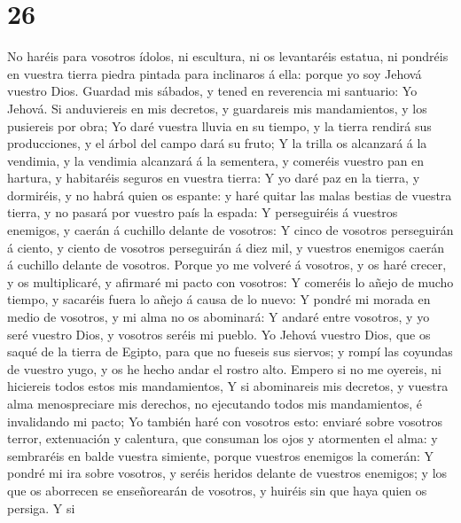 \hypertarget{section-25}{%
\section{26}\label{section-25}}

 No haréis para vosotros ídolos, ni escultura, ni os
levantaréis estatua, ni pondréis en vuestra tierra piedra pintada para
inclinaros á ella: porque yo soy Jehová vuestro Dios. 
Guardad mis sábados, y tened en reverencia mi santuario: Yo Jehová.
 Si anduviereis en mis decretos, y guardareis mis
mandamientos, y los pusiereis por obra;  Yo daré vuestra
lluvia en su tiempo, y la tierra rendirá sus producciones, y el árbol
del campo dará su fruto;  Y la trilla os alcanzará á la
vendimia, y la vendimia alcanzará á la sementera, y comeréis vuestro pan
en hartura, y habitaréis seguros en vuestra tierra:  Y yo
daré paz en la tierra, y dormiréis, y no habrá quien os espante: y haré
quitar las malas bestias de vuestra tierra, y no pasará por vuestro país
la espada:  Y perseguiréis á vuestros enemigos, y caerán á
cuchillo delante de vosotros:  Y cinco de vosotros
perseguirán á ciento, y ciento de vosotros perseguirán á diez mil, y
vuestros enemigos caerán á cuchillo delante de vosotros. 
Porque yo me volveré á vosotros, y os haré crecer, y os multiplicaré, y
afirmaré mi pacto con vosotros:  Y comeréis lo añejo de
mucho tiempo, y sacaréis fuera lo añejo á causa de lo nuevo:
 Y pondré mi morada en medio de vosotros, y mi alma no os
abominará:  Y andaré entre vosotros, y yo seré vuestro
Dios, y vosotros seréis mi pueblo.  Yo Jehová vuestro
Dios, que os saqué de la tierra de Egipto, para que no fueseis sus
siervos; y rompí las coyundas de vuestro yugo, y os he hecho andar el
rostro alto.  Empero si no me oyereis, ni hiciereis todos
estos mis mandamientos,  Y si abominareis mis decretos, y
vuestra alma menospreciare mis derechos, no ejecutando todos mis
mandamientos, é invalidando mi pacto;  Yo también haré
con vosotros esto: enviaré sobre vosotros terror, extenuación y
calentura, que consuman los ojos y atormenten el alma: y sembraréis en
balde vuestra simiente, porque vuestros enemigos la comerán:
 Y pondré mi ira sobre vosotros, y seréis heridos delante
de vuestros enemigos; y los que os aborrecen se enseñorearán de
vosotros, y huiréis sin que haya quien os persiga.  Y si
